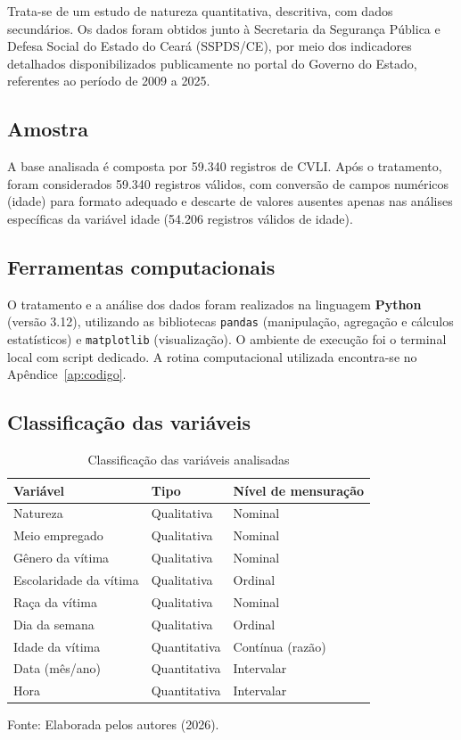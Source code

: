 \documentclass[12pt,a4paper]{article}
\newcommand{\fonte}[1]{  \vspace{-2mm}
  \begin{center}\footnotesize Fonte: #1\end{center}
}
\begin{document}
Trata-se de um estudo de natureza quantitativa, descritiva, com dados secundários. Os dados foram obtidos junto à Secretaria da Segurança Pública e Defesa Social do Estado do Ceará (SSPDS/CE), por meio dos indicadores detalhados disponibilizados publicamente no portal do Governo do Estado, referentes ao período de 2009 a 2025.

\subsection{Amostra}

A base analisada é composta por 59.340 registros de CVLI. Após o tratamento, foram considerados 59.340 registros válidos, com conversão de campos numéricos (idade) para formato adequado e descarte de valores ausentes apenas nas análises específicas da variável idade (54.206 registros válidos de idade).

\subsection{Ferramentas computacionais}

O tratamento e a análise dos dados foram realizados na linguagem \textbf{Python} (versão 3.12), utilizando as bibliotecas \texttt{pandas} (manipulação, agregação e cálculos estatísticos) e \texttt{matplotlib} (visualização). O ambiente de execução foi o terminal local com script dedicado. A rotina computacional utilizada encontra-se no Apêndice~\ref{ap:codigo}.

\subsection{Classificação das variáveis}

\begin{table}[H]
\centering
\caption{Classificação das variáveis analisadas}
\label{tab:variaveis}
\begin{tabular}{lll}
\toprule
\textbf{Variável} & \textbf{Tipo} & \textbf{Nível de mensuração} \\
\midrule
Natureza               & Qualitativa  & Nominal   \\
Meio empregado         & Qualitativa  & Nominal   \\
Gênero da vítima       & Qualitativa  & Nominal   \\
Escolaridade da vítima & Qualitativa  & Ordinal   \\
Raça da vítima         & Qualitativa  & Nominal   \\
Dia da semana          & Qualitativa  & Ordinal   \\
Idade da vítima        & Quantitativa & Contínua (razão) \\
Data (mês/ano)         & Quantitativa & Intervalar \\
Hora                   & Quantitativa & Intervalar \\
\bottomrule
\end{tabular}
\end{table}
\fonte{Elaborada pelos autores (2026).}
\end{document}
